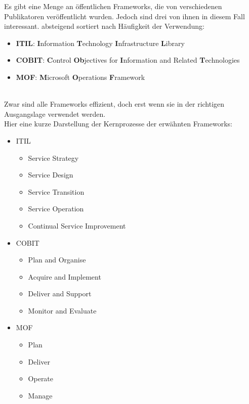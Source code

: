 Es gibt eine Menge an öffentlichen Frameworks, die von verschiedenen Publikatoren
veröffentlicht wurden. Jedoch sind drei von ihnen in diesem Fall interessant.
absteigend sortiert nach Häufigkeit der Verwendung:
\\
\begin{itemize}
    \item \textbf{ITIL}:  \textbf{I}nformation \textbf{T}echnology \textbf{I}nfrastructure
                          \textbf{L}ibrary
    \item \textbf{COBIT}: \textbf{C}ontrol \textbf{Ob}jectives for \textbf{I}nformation 
                          and Related \textbf{T}echnologies
    \item \textbf{MOF}:   \textbf{M}icrosoft \textbf{O}perations \textbf{F}ramework
\end{itemize}
\noindent
\\
Zwar sind alle Frameworks effizient, doch erst wenn sie in der richtigen
Ausgangslage verwendet werden. 
\\
Hier eine kurze Darstellung der Kernprozesse der erwähnten Frameworks:

\begin{itemize}
    \item ITIL
    \begin{itemize}
        \item Service Strategy
        \item Service Design
        \item Service Transition
        \item Service Operation
        \item Continual Service Improvement
    \end{itemize}
    \item COBIT
    \begin{itemize}
        \item Plan and Organise
        \item Acquire and Implement
        \item Deliver and Support
        \item Monitor and Evaluate
    \end{itemize}
    \item MOF
    \begin{itemize}
        \item Plan
        \item Deliver
        \item Operate
        \item Manage
    \end{itemize}
\end{itemize}

